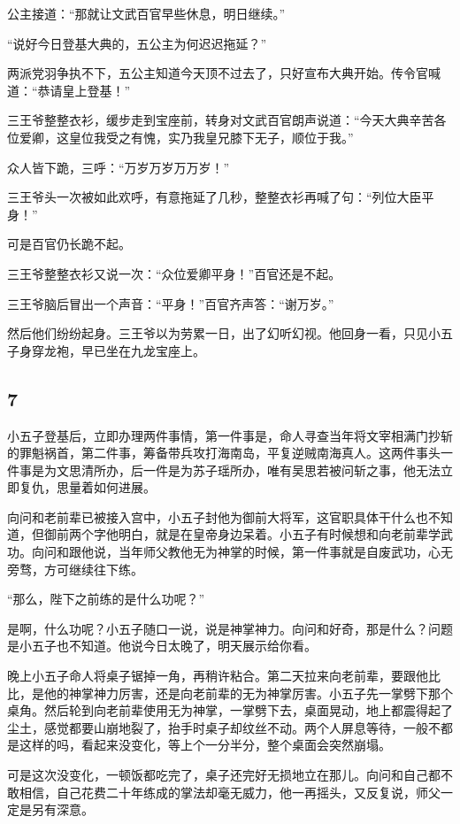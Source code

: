 公主接道：“那就让文武百官早些休息，明日继续。”

“说好今日登基大典的，五公主为何迟迟拖延？”

两派党羽争执不下，五公主知道今天顶不过去了，只好宣布大典开始。传令官喊道：“恭请皇上登基！”

三王爷整整衣衫，缓步走到宝座前，转身对文武百官朗声说道：“今天大典辛苦各位爱卿，这皇位我受之有愧，实乃我皇兄膝下无子，顺位于我。”

众人皆下跪，三呼：“万岁万岁万万岁！”

三王爷头一次被如此欢呼，有意拖延了几秒，整整衣衫再喊了句：“列位大臣平身！”

可是百官仍长跪不起。

三王爷整整衣衫又说一次：“众位爱卿平身！”百官还是不起。

三王爷脑后冒出一个声音：“平身！”百官齐声答：“谢万岁。”

然后他们纷纷起身。三王爷以为劳累一日，出了幻听幻视。他回身一看，只见小五子身穿龙袍，早已坐在九龙宝座上。
\newline

{\centering\subsection{7}}

小五子登基后，立即办理两件事情，第一件事是，命人寻查当年将文宰相满门抄斩的罪魁祸首，第二件事，筹备带兵攻打海南岛，平复逆贼南海真人。这两件事头一件事是为文思清所办，后一件是为苏子瑶所办，唯有吴思若被问斩之事，他无法立即复仇，思量着如何进展。

向问和老前辈已被接入宫中，小五子封他为御前大将军，这官职具体干什么也不知道，但御前两个字他明白，就是在皇帝身边呆着。小五子有时候想和向老前辈学武功。向问和跟他说，当年师父教他无为神掌的时候，第一件事就是自废武功，心无旁骛，方可继续往下练。

“那么，陛下之前练的是什么功呢？”

是啊，什么功呢？小五子随口一说，说是神掌神力。向问和好奇，那是什么？问题是小五子也不知道。他说今日太晚了，明天展示给你看。

晚上小五子命人将桌子锯掉一角，再稍许粘合。第二天拉来向老前辈，要跟他比比，是他的神掌神力厉害，还是向老前辈的无为神掌厉害。小五子先一掌劈下那个桌角。然后轮到向老前辈使用无为神掌，一掌劈下去，桌面晃动，地上都震得起了尘土，感觉都要山崩地裂了，抬手时桌子却纹丝不动。两个人屏息等待，一般不都是这样的吗，看起来没变化，等上个一分半分，整个桌面会突然崩塌。

可是这次没变化，一顿饭都吃完了，桌子还完好无损地立在那儿。向问和自己都不敢相信，自己花费二十年练成的掌法却毫无威力，他一再摇头，又反复说，师父一定是另有深意。

